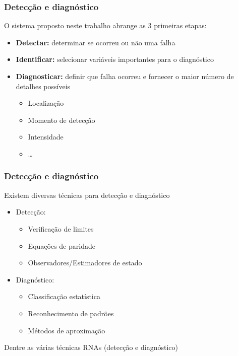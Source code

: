 \documentclass{beamer}
\begin{document}
\begin{frame}
    \frametitle{Detecção e diagnóstico}

    O sistema proposto neste trabalho abrange as 3 primeiras etapas:

\begin{itemize}
    \item {\bf Detectar:} determinar se ocorreu ou não uma falha
    \item {\bf Identificar:} selecionar variáveis importantes para o diagnóstico
    \item {\bf Diagnosticar:} definir que falha ocorreu e fornecer o maior
          número de detalhes possíveis
    \begin{itemize}
        \item Localização
        \item Momento de detecção
        \item Intensidade
        \item \ldots
    \end{itemize}
\end{itemize}
\end{frame}

\begin{frame}
    \frametitle{Detecção e diagnóstico}

    Existem diversas técnicas para detecção e diagnóstico

\begin{itemize}
    \item Detecção:
        \begin{itemize}
            \item Verificação de limites
            \item Equações de paridade
            \item Observadores/Estimadores de estado
        \end{itemize}
    \item Diagnóstico:
        \begin{itemize}
            \item Classificação estatística
            \item Reconhecimento de padrões
            \item Métodos de aproximação
        \end{itemize}
\end{itemize}

    Dentre as várias técnicas \implica RNAs (detecção e diagnóstico)
\end{frame}
\end{document}
